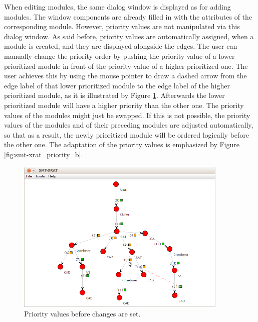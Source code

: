 When editing modules, the same dialog window is displayed as for adding modules.
The window components are already filled in with the attributes of the corresponding
module. However, priority values are not manipulated via this dialog window. As said before,
priority values are automatically assigned, when a module is created, and they are 
displayed alongside the edges. The user can manually change the priority order by 
pushing the priority value of a lower prioritized module in front of the priority
value of a higher prioritized one. The user achieves this by using the mouse pointer
to draw a dashed arrow from the edge label of that lower prioritized module to the
edge label of the higher prioritized module, as it is illustrated by Figure
\ref{fig:smt-xrat_priority_a}. Afterwards the lower prioritized module will have a higher
priority than the other one. The priority values of the modules might just be swapped.
If this is not possible, the priority values of the modules and of their preceding modules
are adjusted automatically, so that as a result, the newly prioritized module will be
ordered logically before the other one. The adaptation of the priority values is
emphasized by Figure \ref{fig:smt-xrat_priority_b}.
\begin{figure}
  \begin{center}
    \includegraphics[width=0.9\textwidth]{graphics/smt-xrat_priority_a.png}
  \end{center}
  \caption{Priority values before changes are set.}
  \label{fig:smt-xrat_priority_a}
\end{figure}

